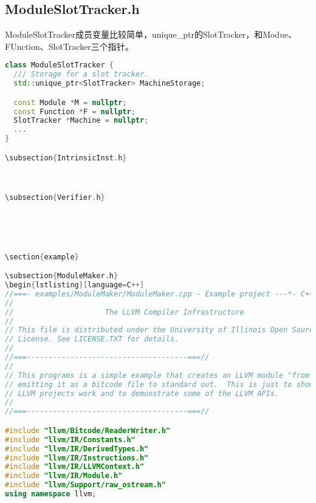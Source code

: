 \documentclass{ctexart}
\begin{document}
\subsection{ModuleSlotTracker.h}
ModuleSlotTracker成员变量比较简单，unique_ptr的SlotTracker，和Modue、FUnction、SlotTracker三个指针。
\begin{lstlisting}[language=C++]
class ModuleSlotTracker {
  /// Storage for a slot tracker.
  std::unique_ptr<SlotTracker> MachineStorage;

  const Module *M = nullptr;
  const Function *F = nullptr;
  SlotTracker *Machine = nullptr;
  ...
}

\subsection{IntrinsicInst.h}



\subsection{Verifier.h}





\section{example}

\subsection{ModuleMaker.h}
\begin{lstlisting}[language=C++]
//===- examples/ModuleMaker/ModuleMaker.cpp - Example project ---*- C++ -*-===//
//
//                     The LLVM Compiler Infrastructure
//
// This file is distributed under the University of Illinois Open Source
// License. See LICENSE.TXT for details.
//
//===-------------------------------------===//
//
// This programs is a simple example that creates an LLVM module "from scratch",
// emitting it as a bitcode file to standard out.  This is just to show how
// LLVM projects work and to demonstrate some of the LLVM APIs.
//
//===-------------------------------------===//

#include "llvm/Bitcode/ReaderWriter.h"
#include "llvm/IR/Constants.h"
#include "llvm/IR/DerivedTypes.h"
#include "llvm/IR/Instructions.h"
#include "llvm/IR/LLVMContext.h"
#include "llvm/IR/Module.h"
#include "llvm/Support/raw_ostream.h"
using namespace llvm;


\end{lstlisting}
\end{document}
